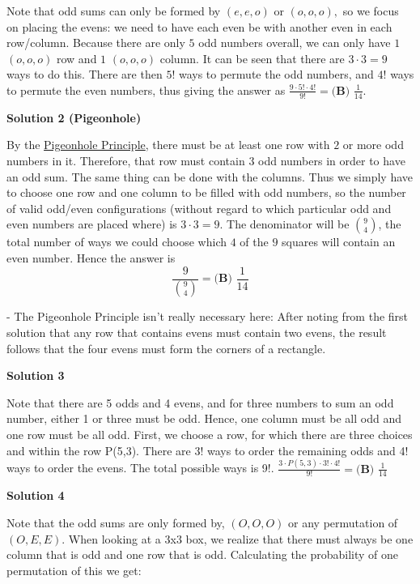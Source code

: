 \begin{enumerate}
Note that odd sums can only be formed by $(e,e,o)$ or $(o,o,o),$ so we focus on placing the evens: we need to have each even be with another even in each row/column. Because there are only $5$ odd numbers overall, we can only have $1$ $(o,o,o)$ row and $1$ $(o,o,o)$ column. It can be seen that there are $3 \cdot 3 = 9$ ways to do this. There  are then $5!$ ways to permute the odd numbers, and $4!$ ways to permute the even numbers, thus giving the answer as $\frac{9 \cdot 5! \cdot 4!}{9!}=\boxed{\textbf{(B) }\frac{1}{14}}$.

 



\textbf{Solution 2 (Pigeonhole)}

By the \href{https://artofproblemsolving.com/wiki/index.php/Pigeonhole\_Principle}{Pigeonhole Principle}, there must be at least one row with $2$ or more odd numbers in it. Therefore, that row must contain $3$ odd numbers in order to have an odd sum. The same thing can be done with the columns. Thus we simply have to choose one row and one column to be filled with odd numbers, so the number of valid odd/even configurations (without regard to which particular odd and even  numbers are placed where) is $3 \cdot 3 = 9$. The denominator will be $\binom{9}{4}$, the total number of ways we could choose which $4$ of the $9$ squares will contain an even number. Hence the answer is 
 \[\frac{9}{\binom{9}{4}}=\boxed{\textbf{(B) }\frac{1}{14}}\]

 - The Pigeonhole Principle isn't really necessary here: After noting from the first solution that any row that contains evens must contain two evens, the result follows that the four evens must form the corners of a rectangle.

 



\textbf{Solution 3}

Note that there are 5 odds and 4 evens, and for three numbers to sum an odd number, either 1 or three must be odd. Hence, one column must be all odd and one row must be all odd. First, we choose a row, for which there are three choices and within the row P(5,3). There are 3! ways to order the remaining odds and 4! ways to order the evens. The total possible ways is 9!. $\frac{3 \cdot P(5,3) \cdot 3! \cdot 4!}{9!}=\boxed{\textbf{(B) }\frac{1}{14}}$




\textbf{Solution 4}

Note that the odd sums are only formed by, $(O, O, O)$ or any permutation of $(O, E, E)$. When looking at a 3x3 box, we realize that there must always be one column that is odd and one row that is odd. Calculating the probability of one permutation of this we get:


\end{enumerate}
